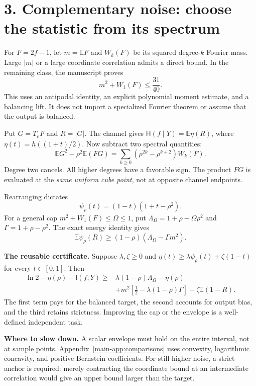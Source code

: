 \documentclass[11pt]{article}
\newcommand{\E}{\mathbb E}\newcommand{\Pp}{\mathbb P}\newcommand{\HH}{\mathsf H}\newcommand{\II}{\mathsf I}
\begin{document}
\newpage
\section*{3. Complementary noise: choose the statistic from its spectrum}
For $F=2f-1$, let $m=\E F$ and $W_k(F)$ be its squared degree-$k$ Fourier mass. Large $|m|$ or a large coordinate correlation admits a direct bound. In the remaining class, the manuscript proves
\[
 m^2+W_1(F)\le\frac{31}{40}.
\]
This uses an antipodal identity, an explicit polynomial moment estimate, and a balancing lift. It does not import a specialized Fourier theorem or assume that the output is balanced.

Put $G=T_\rho F$ and $R=|G|$. The channel gives
$\HH(f\mid Y)=\E\eta(R)$, where $\eta(t)=h((1+t)/2)$. Now subtract two spectral quantities:
\[
 \E G^2-\rho^2\E(FG)
 =\sum_{k\ge0}(\rho^{2k}-\rho^{k+2})W_k(F).
\]
Degree two cancels. All higher degrees have a favorable sign. The product $FG$ is evaluated at the \emph{same uniform cube point}, not at opposite channel endpoints.

Rearranging dictates
\[
 \psi_\rho(t)=(1-t)(1+t-\rho^2).
\]
For a general cap $m^2+W_1(F)\le\Omega\le1$, put
$\Lambda_\Omega=1+\rho-\Omega\rho^2$ and $\Gamma=1+\rho-\rho^2$.
The exact energy identity gives
\[
 \E\psi_\rho(R)\ge(1-\rho)(\Lambda_\Omega-\Gamma m^2).
\]

\textbf{The reusable certificate.} Suppose $\lambda,\zeta\ge0$ and
$\eta(t)\ge\lambda\psi_\rho(t)+\zeta(1-t)$ for every $t\in[0,1]$. Then
\[
\begin{aligned}
 \ln2-\eta(\rho)-\II(f;Y)\ge{}&
 \lambda(1-\rho)\Lambda_\Omega-\eta(\rho)\\
 &+m^2\left[\frac12-\lambda(1-\rho)\Gamma\right]
 +\zeta\E(1-R).
\end{aligned}
\]
The first term pays for the balanced target, the second accounts for output bias, and the third retains strictness. Improving the cap or the envelope is a well-defined independent task.

\textbf{Where to slow down.} A scalar envelope must hold on the entire interval, not at sample points. Appendix~\ref{main-app:comparisons} uses convexity, logarithmic concavity, and positive Bernstein coefficients. For still higher noise, a strict anchor is required: merely contracting the coordinate bound at an intermediate correlation would give an upper bound larger than the target.

\newpage
\end{document}
